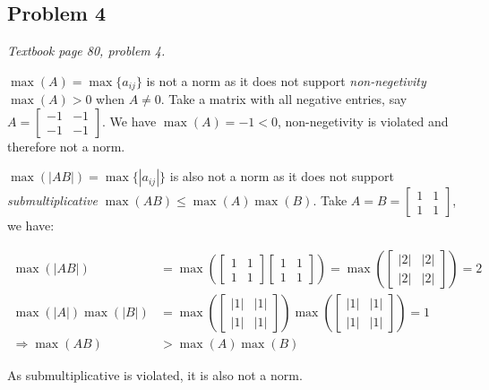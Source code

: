 \documentclass[11pt]{article}
\providecommand{\qbm}[1]{\begin{bmatrix} #1 \end{bmatrix}}
\providecommand{\len}[1]{\left| #1 \right|}
\begin{document}
\subsection*{Problem 4}
\textit{Textbook page 80, problem 4.}\newline

$\max(A) = \max \{a_{ij}\}$ is not a norm as it does not support \textit{non-negetivity} $\max(A) > 0$ when $A \neq 0$. Take a matrix with all negative entries, say $A = \qbm{-1 & -1 \\ -1 & -1}$. We have $\max(A) = -1 < 0$, non-negetivity is violated and therefore not a norm.\newline

$\max(\len{AB}) = \max \{|a_{ij}|\}$ is also not a norm as it does not support \textit{submultiplicative} $\max(AB) \leq \max(A)\max(B)$. Take $A = B = \qbm{1 & 1 \\ 1 & 1}$, we have:

\begin{align*}
    \max(\len{AB}) &= \max(\qbm{1 & 1 \\ 1 & 1}\qbm{1 & 1 \\ 1 & 1}) = \max(\qbm{\len{2} & \len{2} \\ \len{2} & \len{2}}) = 2 \\
    \max(\len{A})\max(\len{B}) &= \max(\qbm{\len{1} & \len{1} \\ \len{1} & \len{1}}) \max(\qbm{\len{1} & \len{1} \\\len{1} & \len{1}}) = 1 \\
    \Longrightarrow \max(AB) &> \max(A)\max(B)
\end{align*}

As submultiplicative is violated, it is also not a norm.
\end{document}
